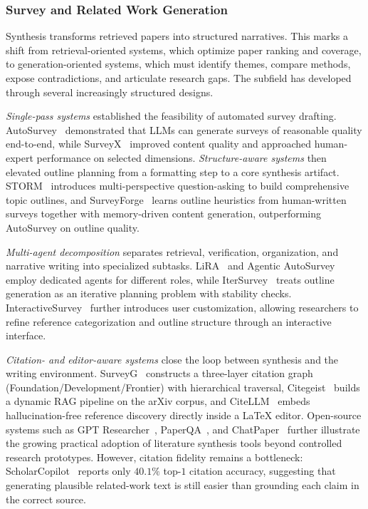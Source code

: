 \documentclass{llmxive}
\begin{document}
\subsubsection{Survey and Related Work Generation}
\label{sec:related_work}

Synthesis transforms retrieved papers into structured narratives. This marks a shift from retrieval-oriented systems, which optimize paper ranking and coverage, to generation-oriented systems, which must identify themes, compare methods, expose contradictions, and articulate research gaps. The subfield has developed through several increasingly structured designs.

\emph{Single-pass systems} established the feasibility of automated survey drafting. AutoSurvey~\cite{wang2024autosurvey} demonstrated that LLMs can generate surveys of reasonable quality end-to-end, while SurveyX~\cite{liang2025surveyx} improved content quality and approached human-expert performance on selected dimensions. \emph{Structure-aware systems} then elevated outline planning from a formatting step to a core synthesis artifact. STORM~\cite{shao2024storm} introduces multi-perspective question-asking to build comprehensive topic outlines, and SurveyForge~\cite{gao2025surveyforge} learns outline heuristics from human-written surveys together with memory-driven content generation, outperforming AutoSurvey on outline quality.

\emph{Multi-agent decomposition} separates retrieval, verification, organization, and narrative writing into specialized subtasks. LiRA~\cite{lira2025} and Agentic AutoSurvey~\cite{agenticautosurvey2025} employ dedicated agents for different roles, while IterSurvey~\cite{itersurvey2025} treats outline generation as an iterative planning problem with stability checks. InteractiveSurvey~\cite{interactivesurvey2025} further introduces user customization, allowing researchers to refine reference categorization and outline structure through an interactive interface.

\emph{Citation- and editor-aware systems} close the loop between synthesis and the writing environment. SurveyG~\cite{surveyg2025} constructs a three-layer citation graph (Foundation/Development/Frontier) with hierarchical traversal, Citegeist~\cite{beger2025citegeist} builds a dynamic RAG pipeline on the arXiv corpus, and CiteLLM~\cite{citellm2026} embeds hallucination-free reference discovery directly inside a LaTeX editor. Open-source systems such as GPT Researcher~\cite{gptresearcher2024}, PaperQA~\cite{paperqa2024github}, and ChatPaper~\cite{chatpaper2023} further illustrate the growing practical adoption of literature synthesis tools beyond controlled research prototypes. However, citation fidelity remains a bottleneck: ScholarCopilot~\cite{scholarcop2025} reports only $40.1\%$ top-$1$ citation accuracy, suggesting that generating plausible related-work text is still easier than grounding each claim in the correct source.
\end{document}
